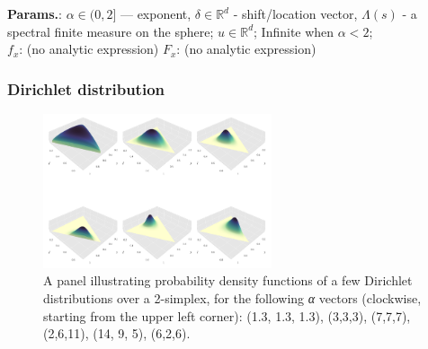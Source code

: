     {\color{darkblue} \textbf{Params.}:} {$\alpha \in (0,2]$ — exponent,  $\delta \in \mathbb{R}^d$ - shift/location vector,  $\Lambda(s)$ - a spectral finite measure on the sphere}; {$u \in \mathbb{R}^d$}; {Infinite when $\alpha < 2$};\hspace{0.5cm}\\{\color{darkblue} \textbf{$f_x$}:} {(no analytic expression)}{\color{darkblue} \textbf{$F_x$}:} {(no analytic expression)}



    
        
\subsubsection{Dirichlet distribution}


    \begin{figure}[H]
        \centering
        \includegraphics[width=0.6\textwidth]{images/Dirichlet-3d-panel.png}
        \caption{A panel illustrating probability density functions of a few Dirichlet distributions over a 2-simplex, for the following \textit{α} vectors (clockwise, starting from the upper left corner): (1.3, 1.3, 1.3), (3,3,3), (7,7,7), (2,6,11), (14, 9, 5), (6,2,6).}
    \end{figure}




